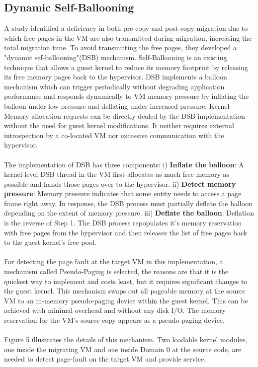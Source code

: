 \documentclass[runningheads]{llncs}
\begin{document}
\subsection{Dynamic Self-Ballooning}
A study identified a deficiency in both pre-copy and post-copy migration due to which free pages in the VM are also transmitted during migration, increasing the total migration time. To avoid transmitting the free pages, they developed a "dynamic sef-ballooning"(DSB) mechanism\cite{hines2009post}. Self-Ballooning is an existing technique that allows a guest kernel to reduce its memory footprint by releasing its free memory pages back to the hypervisor. DSB implements a balloon mechanism which can trigger periodically without degrading application performance and responds dynamically to VM memory pressure by inflating the balloon under low pressure and deflating under increased pressure. Kernel Memory allocation requests can be directly dealed by the DSB implementation without the need for guest kernel modifications. It neither requires external introspection by a co-located VM nor excessive communication with the hypervisor. 
\\\\
The implementation of DSB has three components: i) \textbf{Inflate the balloon}: A kernel-level DSB thread in the VM first allocates as much free memory as possible and hands those pages over to the hypervisor. ii) \textbf{Detect memory pressure}: Memory pressure indicates that some entity needs to access a page frame right away. In response, the DSB process must partially deflate the balloon depending on the extent of memory pressure. iii) \textbf{Deflate the balloon}: Deflation is the reverse of Step 1. The DSB process repopulates it’s memory reservation with free pages from the hypervisor and then releases the list of free pages back to the guest kernel’s free pool\cite{hines2009post}.
\\\\
For detecting the page fault at the target VM in this implementation, a mechanism called Pseudo-Paging is selected, the reasons are that it is the quickest way to implement and costs least, but it requires significant changes to the guest kernel. This mechanism swaps out all pageable memory at the source VM to an in-memory pseudo-paging device within the guest kernel. This can be achieved with minimal overhead and without any disk I/O. The memory reservation for the VM’s source copy appears as a pseudo-paging device.
\\\\
Figure 5 illustrates the details of this mechanism. Two loadable kernel modules, one inside the migrating VM and one inside Domain 0 at the source code, are needed to detect page-fault on the target VM and provide service.
\end{document}
